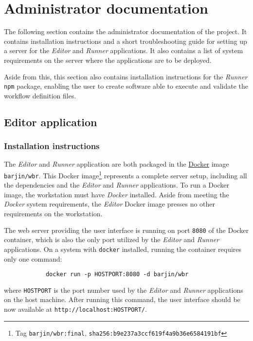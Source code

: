 
\section{Administrator documentation} \label{adminDocs}

The following section contains the administrator documentation of the project.
It contains installation instructions and a short troubleshooting guide for setting up a server for the \textit{Editor} and \textit{Runner} applications. 
It also contains a list of system requirements on the server where the applications are to be deployed.

Aside from this, this section also contains installation instructions for the \textit{Runner} \texttt{npm} package, enabling the user to create software able to execute and validate the workflow definition files.

\subsection{Editor application}


\subsubsection{Installation instructions}

The \textit{Editor} and \textit{Runner} application are both packaged in the \href{https://www.docker.com/}{Docker} image \texttt{barjin/wbr}.
This Docker image\footnote{Tag \texttt{barjin/wbr:final}, \texttt{sha256:b9e237a3ccf619f4a9b36e6584191bf}} represents a complete server setup, including all the dependencies and the \textit{Editor} and \textit{Runner} applications.
To run a Docker image, the workstation must have \textit{Docker} installed. 
Aside from meeting the \textit{Docker} system requirements, the \textit{Editor} Docker image presses no other requirements on the workstation.

The web server providing the user interface is running on port \texttt{8080} of the Docker container, which is also the only port utilized by the \textit{Editor} and \textit{Runner} applications.
On a system with \texttt{docker} installed, running the container requires only one command:

\begin{verbatim}
            docker run -p HOSTPORT:8080 -d barjin/wbr
\end{verbatim}
where \texttt{HOSTPORT} is the port number used by the \textit{Editor} and \textit{Runner} applications on the host machine.
After running this command, the user interface should be now available at \texttt{http://localhost:HOSTPORT/}.

